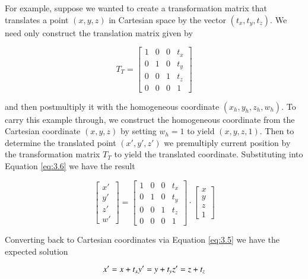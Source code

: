 For example, suppose we wanted to create a transformation matrix that translates a point $( x, y, z)$ in Cartesian space by the vector $( t_x , t_y, t_z)$. We need only construct the translation matrix given by

\begin{equation}\label{eq:3.6}
T_T = \left[\begin{array}{cccc}
1 & 0 & 0 & t_x       \\
0 & 1 & 0 & t_y      \\
0 & 0 & 1 & t_z      \\
0 & 0 & 0 & 1
\end{array}\right]
\end{equation}

\noindent and then postmultiply it with the homogeneous coordinate $(x_h, y_h, z_h, w_h)$. To carry this example through, we construct the homogeneous coordinate from the Cartesian coordinate $( x, y, z)$ by setting $w_h = 1$ to yield $(x, y, z, 1)$. Then to determine the translated point $(x' , y', z')$ we premultiply current position by the transformation matrix $T_T$ to yield the translated coordinate. Substituting into Equation \ref{eq:3.6} we have the result

\begin{equation}\label{eq:3.7}
\left[\begin{array}{c}
x'      \\
y'       \\
z'      \\
w'
\end{array}\right] =\left[\begin{array}{cccc}
1 & 0 & 0 & t_x       \\
0 & 1 & 0 & t_y       \\
0 & 0 & 1 & t_z      \\
0 & 0 & 0 & 1
\end{array}\right] \cdot
\left[\begin{array}{c}
x      \\
y       \\
z      \\
1
\end{array}\right]
\end{equation}

\noindent Converting back to Cartesian coordinates via Equation \ref{eq:3.5} we have the expected solution

\begin{equation}\label{eq:3.8}
x' = x +t_x \\
y' = y + t_y \\
z' = z + t_z
\end{equation}

